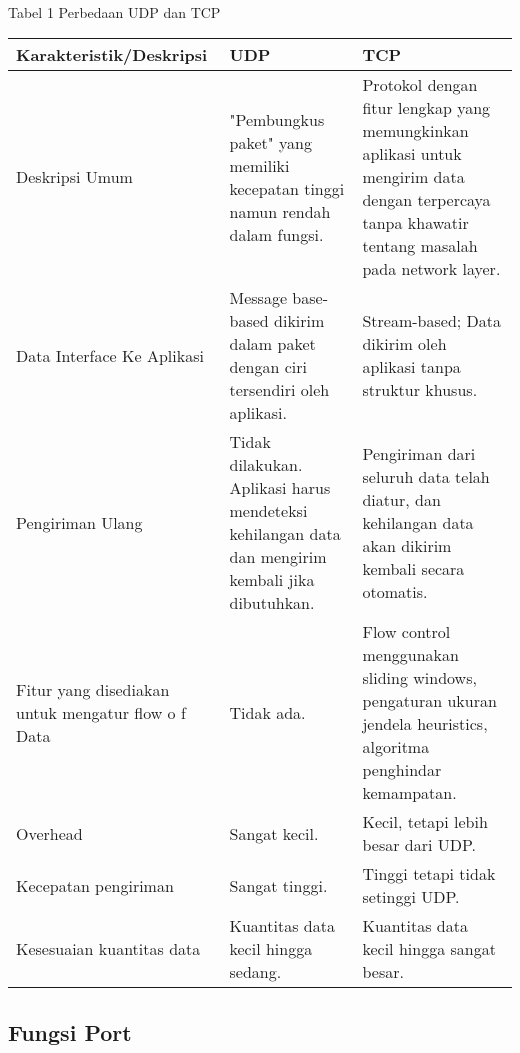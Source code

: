 \paragraph{}

Tabel 1 Perbedaan UDP dan TCP\\
\begin{tabular}{|p{4.5cm}|p{5cm}|p{5cm}|}

\hline
Karakteristik/Deskripsi & UDP & TCP \\
\hline
Deskripsi Umum & "Pembungkus paket" yang
memiliki kecepatan tinggi
namun rendah dalam
fungsi. &Protokol dengan fitur
lengkap yang
memungkinkan aplikasi
untuk mengirim data
dengan terpercaya tanpa
khawatir tentang masalah
pada network layer.\\
\hline

\hline
Data Interface Ke
Aplikasi & Message base-based dikirim
dalam paket dengan ciri
tersendiri oleh aplikasi. & Stream-based; Data dikirim
oleh aplikasi tanpa
struktur khusus.\\
\hline

\hline
Pengiriman Ulang & Tidak dilakukan. Aplikasi
harus mendeteksi
kehilangan data dan
mengirim kembali jika
dibutuhkan. & Pengiriman dari seluruh
data telah diatur, dan
kehilangan data akan
dikirim kembali secara
otomatis.\\
\hline

\hline
Fitur yang
disediakan untuk
mengatur flow o f
Data & Tidak ada. & Flow control menggunakan
sliding windows,
pengaturan ukuran jendela
heuristics, algoritma
penghindar kemampatan.\\
\hline

\hline
Overhead & Sangat kecil. & Kecil, tetapi lebih besar dari
UDP.\\
\hline

\hline
Kecepatan
pengiriman & Sangat tinggi. & Tinggi tetapi tidak setinggi
UDP.\\
\hline

\hline
Kesesuaian
kuantitas data & Kuantitas data kecil hingga
sedang. & Kuantitas data kecil hingga
sangat besar.\\
\hline

\end{tabular}



\subsection{Fungsi Port}
